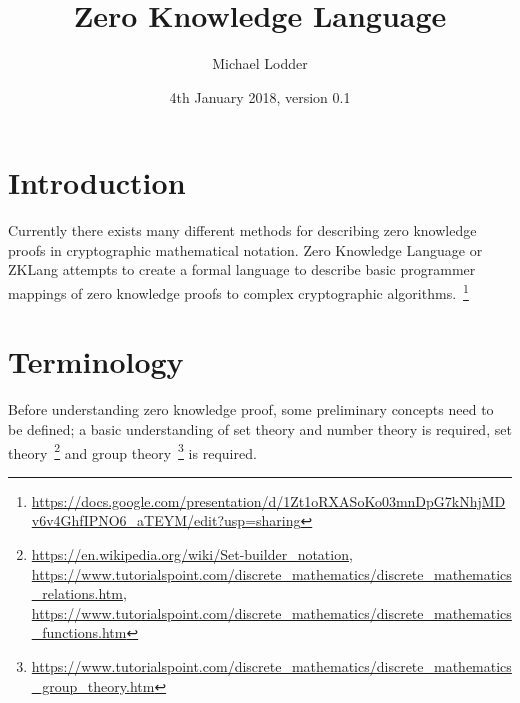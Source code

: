 \documentclass[a4paper]{article}
\title{Zero Knowledge Language}
\author{Michael Lodder}
\date{4th January 2018, version 0.1}
\begin{document}
  
  \maketitle
  
  \section{Introduction}
  
  Currently there exists many different methods for describing zero knowledge proofs in cryptographic mathematical notation. Zero Knowledge Language or ZKLang attempts to create a formal language to describe basic programmer mappings of zero knowledge proofs to complex cryptographic algorithms.~\footnote{\url{https://docs.google.com/presentation/d/1Zt1oRXASoKo03mnDpG7kNhjMDv6v4GhfIPNO6_aTEYM/edit?usp=sharing}}
  
  \section{Terminology}
  
  Before understanding zero knowledge proof, some preliminary concepts need to be defined; a basic understanding of set theory and number theory is required, set theory~\footnote{\url{https://en.wikipedia.org/wiki/Set-builder_notation}, \url{https://www.tutorialspoint.com/discrete_mathematics/discrete_mathematics_relations.htm}, \url{https://www.tutorialspoint.com/discrete_mathematics/discrete_mathematics_functions.htm}} and group theory~\footnote{\url{https://www.tutorialspoint.com/discrete_mathematics/discrete_mathematics_group_theory.htm}} is required. 
  \newline
  
\end{document}
